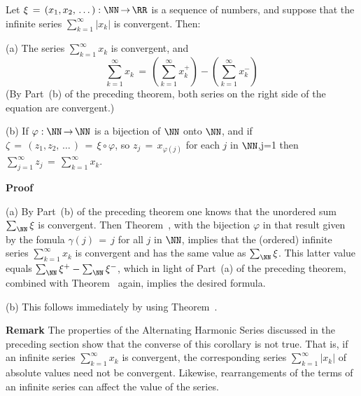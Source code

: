 \V

        Let ${\xi} \,=\, (x_{1},x_{2},\,{\ldots}\,):{\NN} \,{\rightarrow}\, {\RR}$ is a sequence of numbers,
    and suppose that the infinite series $\sum_{k=1}^{{\infty}} |x_{k}|$ is convergent.
    Then:

\V

        (a) The series $\sum_{k=1}^{{\infty}} x_{k}$ is convergent, and
        \begin{displaymath}
        \sum_{k=1}^{{\infty}} x_{k} \,=\, \left(\sum_{k=1}^{{\infty}} x_{k}^{+}\right) - \left(\sum_{k=1}^{{\infty}} x_{k}^{-}\right)
        \end{displaymath}
    (By Part~(b) of the preceding theorem, both series on the right side of the equation are convergent.)

\V

    (b) If ${\varphi}:{\NN} \,{\rightarrow}\, {\NN}$ is a bijection of ${\NN}$ onto ${\NN}$,
    and if ${\zeta} \,=\, (z_{1},z_{2},\,{\ldots}\,) \,=\, {\xi}{\circ}{\varphi}$,
    so $z_{j} \,=\, x_{{\varphi}(j)}$ for each $j$ in ${\NN}$,j=1 then ${\displaystyle \sum_{j=1}^{{\infty}} z_{j} \,=\, \sum_{k=1}^{{\infty}} x_{k}}$.

\V

        {\bf Proof}

\V

        (a) By Part~(b) of the preceding theorem one knows that the unordered sum $\sum_{{\NN}} {\xi}$ is convergent.
    Then Theorem~, with the bijection ${\varphi}$ in that result given by the fomula ${\gamma}(j) \,=\, j$ for all $j$ in ${\NN}$,
    implies that the (ordered) infinite series $\sum_{k=1}^{{\infty}} x_{k}$ is convergent and has the same value as $\sum_{{\NN}} {\xi}$.
    This latter value equals $\sum_{{\NN}} {\xi}^{+} - \sum_{{\NN}} {\xi}^{-}$,
which in light of Part~(a) of the preceding theorem, combined with Theorem~ again, implies the desired formula.

\V

        (b) This follows immediately by using Theorem~.

\V

        {\bf Remark} The properties of the Alternating Harmonic Series discussed in the preceding section show that the converse of this corollary is not true.     
    That is, if an infinite series $\sum_{k=1}^{{\infty}} x_{k}$ is convergent, the corresponding series $\sum_{k=1}^{{\infty}} |x_{k}|$ of absolute values need not be convergent.
    Likewise, rearrangements of the terms of an infinite series can affect the value of the series.


